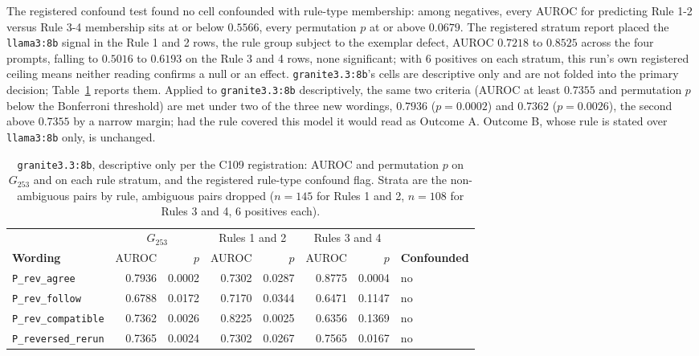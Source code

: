 The registered confound test found no cell confounded with rule-type membership: among
negatives, every AUROC for predicting Rule 1-2 versus Rule 3-4 membership sits at or below
$0.5566$, every permutation $p$ at or above $0.0679$. The registered stratum report placed the
\texttt{llama3:8b} signal in the Rule 1 and 2 rows, the rule group subject to the exemplar defect, AUROC $0.7218$ to $0.8525$ across the four
prompts, falling to $0.5016$ to $0.6193$ on the Rule 3 and 4 rows, none significant;
with $6$ positives on each stratum, this run's own registered ceiling means neither reading
confirms a null or an effect. \texttt{granite3.3:8b}'s cells are descriptive only and are not
folded into the primary decision; Table~\ref{sup:tab:s5-c109-granite} reports them.
Applied to \texttt{granite3.3:8b} descriptively, the same two criteria (AUROC at least
$0.7355$ and permutation $p$ below the Bonferroni threshold) are met under two of the
three new wordings, $0.7936$ ($p = 0.0002$) and $0.7362$ ($p = 0.0026$), the second above
$0.7355$ by a narrow margin; had the rule covered this model it would read as Outcome A.
Outcome B, whose rule is stated over \texttt{llama3:8b} only, is unchanged.

\begin{table}[H]
\caption[C109, descriptive \texttt{granite3.3:8b} cells]{\texttt{granite3.3:8b}, descriptive
only per the C109 registration: AUROC and permutation $p$ on $G_{253}$ and on each rule stratum,
and the registered rule-type confound flag. Strata are the non-ambiguous pairs by rule, ambiguous
pairs dropped ($n = 145$ for Rules 1 and 2, $n = 108$ for Rules 3 and 4, $6$ positives each).}
\centering
\small
\begin{tabular}{lrrrrrrl}
\toprule
 & \multicolumn{2}{c}{$G_{253}$} & \multicolumn{2}{c}{Rules 1 and 2} & \multicolumn{2}{c}{Rules 3 and 4} & \\
\textbf{Wording} & AUROC & $p$ & AUROC & $p$ & AUROC & $p$ & \textbf{Confounded} \\
\midrule
\texttt{P\_rev\_agree}      & 0.7936 & 0.0002 & 0.7302 & 0.0287 & 0.8775 & 0.0004 & no \\
\texttt{P\_rev\_follow}     & 0.6788 & 0.0172 & 0.7170 & 0.0344 & 0.6471 & 0.1147 & no \\
\texttt{P\_rev\_compatible} & 0.7362 & 0.0026 & 0.8225 & 0.0025 & 0.6356 & 0.1369 & no \\
\texttt{P\_reversed\_rerun} & 0.7365 & 0.0024 & 0.7302 & 0.0267 & 0.7565 & 0.0167 & no \\
\bottomrule
\end{tabular}
\label{sup:tab:s5-c109-granite}
\end{table}

